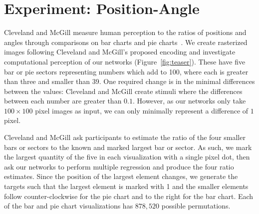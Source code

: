 \clearpage
\section{Experiment: Position-Angle}

Cleveland and McGill measure human perception to the ratios of positions and angles through comparisons on bar charts and pie charts~\cite{cleveland_mcgill}. We create rasterized images following Cleveland and McGill's proposed encoding and investigate computational perception of our networks (Figure~\ref{fig:teaser}). These have five bar or pie sectors representing numbers which add to 100, where each is greater than three and smaller than 39. One required change is in the minimal differences between the values: Cleveland and McGill create stimuli where the differences between each number are greater than $0.1$. However, as our networks only take $100\times100$ pixel images as input, we can only minimally represent a difference of $1$ pixel.

Cleveland and McGill ask participants to estimate the ratio of the four smaller bars or sectors to the known and marked largest bar or sector. As such, we mark the largest quantity of the five in each visualization with a single pixel dot, then ask our networks to perform multiple regression and produce the four ratio estimates. Since the position of the largest element changes, we generate the targets such that the largest element is marked with 1 and the smaller elements follow counter-clockwise for the pie chart and to the right for the bar chart. Each of the bar and pie chart visualizations has $878,520$ possible permutations.


